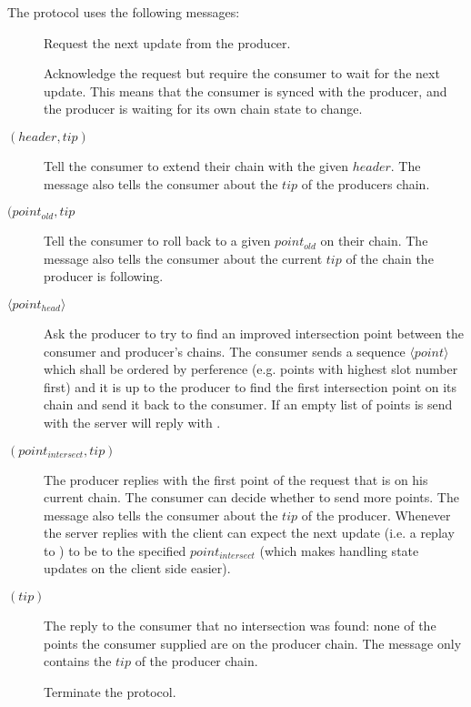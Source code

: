 The protocol uses the following messages:
\begin{description}
\item [\MsgRequestNext]
      Request the next update from the producer.
\item [\MsgAwaitReply]
      Acknowledge the request but require the consumer to wait for the next update.
      This means that the consumer is synced with the producer, and
      the producer is waiting for its own chain state to change.
\item [\MsgRollForward{} {\boldmath $(header, tip)$}]
      Tell the consumer to extend their chain with the given $header$.
      The message also tells the consumer about the $tip$ of the producers chain.
\item [\MsgRollBackward{} {\boldmath $(point_{old}, tip$}]
      Tell the consumer to roll back to a given $point_{old}$ on their chain.
      The message also tells the consumer about the current  $tip$ of the chain the producer is following.
\item [\MsgFindIntersect{} {\boldmath $\langle point_{head} \rangle $}]
      Ask the producer to try to find an improved intersection point between
      the consumer and producer's chains.
      The consumer sends a sequence {\boldmath $\langle point \rangle $} which
      shall be ordered by perference (e.g. points with highest slot number
      first) and it is up to the producer to find the first intersection point
      on its chain and send it back to the consumer.  If an empty list of
      points is send with \MsgFindIntersect{} the server will reply with
      \MsgIntersectNotFound{}.  
\item [\MsgIntersectFound{} {\boldmath $(point_{intersect} ,tip)$}]
      The producer replies with the first point of the request that is on his current chain.
      The consumer can decide whether to send more points.
      The message also tells the consumer about the $tip$ of the producer.
      Whenever the server replies with \MsgIntersectFound{} the client can
      expect the next update (i.e. a replay to \MsgRequestNext{}) to be
      \MsgRollBackward{} to the specified $point_{intersect}$ (which makes
      handling state updates on the client side easier).
\item [\MsgIntersectNotFound{} {\boldmath $(tip)$}]
      The reply to the consumer that no intersection was found: none of the
      points the consumer supplied are on the producer chain.
      The message only contains the $tip$ of the producer chain.
\item [\MsgDone]
      Terminate the protocol.
\end{description}

